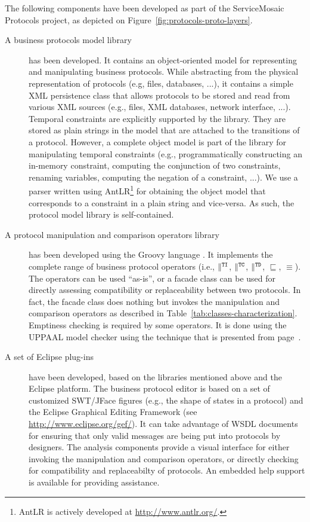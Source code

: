 The following components have been developed as part of the ServiceMosaic Protocols project, as depicted on Figure~\ref{fig:protocols-proto-layers}.
\begin{description}
  
  \item[A business protocols model library] has been developed. It contains an object-oriented model for representing and manipulating business protocols. While abstracting from the physical representation of protocols (e.g, files, databases, ...), it contains a simple XML persistence class that allows protocols to be stored and read from various XML sources (e.g., files, XML databases, network interface, ...). Temporal constraints are explicitly supported by the library. They are stored as plain strings in the model that are attached to the transitions of a protocol. However, a complete object model is part of the library for manipulating temporal constraints (e.g., programmatically constructing an in-memory constraint, computing the conjunction of two constraints, renaming variables, computing the negation of a constraint, ...). We use a parser written using AntLR\footnote{AntLR is actively developed at \url{http://www.antlr.org/}.} \cite{ParrQ95} for obtaining the object model that corresponds to a constraint in a plain string and vice-versa. As such, the protocol model library is self-contained.
  
  \item[A protocol manipulation and comparison operators library] has been developed using the Groovy language  \cite{Groovy07}. It implements the complete range of business protocol operators (i.e., $\parallel^{\mathtt{TI}}$, $\parallel^{\mathtt{TC}}$, $\parallel^{\mathtt{TD}}$, $\sqsubseteq$, $\equiv$). The operators can be used ``as-is'', or a facade class can be used for directly assessing compatibility or replaceability between two protocols. In fact, the facade class does nothing but invokes the manipulation and comparison operators as described in Table~\ref{tab:classes-characterization}. Emptiness checking is required by some operators. It is done using the UPPAAL model checker using the technique that is presented from page~\pageref{chap:uppaal-pta}.
  
  \item[A set of Eclipse plug-ins] have been developed, based on the libraries mentioned above and the Eclipse platform. The business protocol editor is based on a set of customized SWT/JFace figures (e.g., the shape of states in a protocol) and the Eclipse Graphical Editing Framework (see \url{http://www.eclipse.org/gef/}). It can take advantage of WSDL documents for ensuring that only valid messages are being put into protocols by designers. The analysis components provide a visual interface for either invoking the manipulation and comparison operators, or directly checking for compatibility and replaceabilty of protocols. An embedded help support is available for providing assistance.
  
\end{description}

